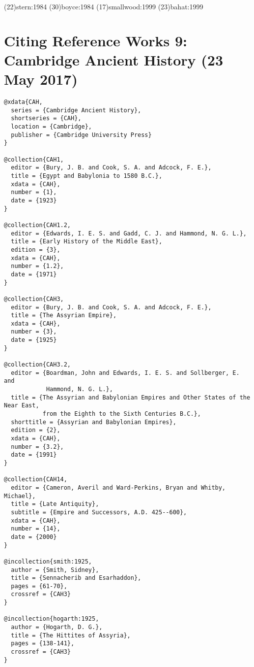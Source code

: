 \documentclass[a4paper]{article}
\begin{document}
\examplecite(22){stern:1984}
\examplecite(30){boyce:1984}
\examplecite(17){smallwood:1999}
\examplecite(23){bahat:1999}
\begin{verbcite}
  \nocite{CHJ2, CHJ4, CHJ5, CHJ6, CHJ7, CHJ8}
\end{verbcite}
\exampleabbreviations
\examplebibliography
{}

\section{Citing Reference Works 9: Cambridge Ancient History (23 May 2017)}

\begin{verbatim}
@xdata{CAH,
  series = {Cambridge Ancient History},
  shortseries = {CAH},
  location = {Cambridge},
  publisher = {Cambridge University Press}
}

@collection{CAH1,
  editor = {Bury, J. B. and Cook, S. A. and Adcock, F. E.},
  title = {Egypt and Babylonia to 1580 B.C.},
  xdata = {CAH},
  number = {1},
  date = {1923}
}

@collection{CAH1.2,
  editor = {Edwards, I. E. S. and Gadd, C. J. and Hammond, N. G. L.},
  title = {Early History of the Middle East},
  edition = {3},
  xdata = {CAH},
  number = {1.2},
  date = {1971}
}

@collection{CAH3,
  editor = {Bury, J. B. and Cook, S. A. and Adcock, F. E.},
  title = {The Assyrian Empire},
  xdata = {CAH},
  number = {3},
  date = {1925}
}

@collection{CAH3.2,
  editor = {Boardman, John and Edwards, I. E. S. and Sollberger, E. and
            Hammond, N. G. L.},
  title = {The Assyrian and Babylonian Empires and Other States of the Near East,
           from the Eighth to the Sixth Centuries B.C.},
  shorttitle = {Assyrian and Babylonian Empires},
  edition = {2},
  xdata = {CAH},
  number = {3.2},
  date = {1991}
}

@collection{CAH14,
  editor = {Cameron, Averil and Ward-Perkins, Bryan and Whitby, Michael},
  title = {Late Antiquity},
  subtitle = {Empire and Successors, A.D. 425--600},
  xdata = {CAH},
  number = {14},
  date = {2000}
}

@incollection{smith:1925,
  author = {Smith, Sidney},
  title = {Sennacherib and Esarhaddon},
  pages = {61-70},
  crossref = {CAH3}
}

@incollection{hogarth:1925,
  author = {Hogarth, D. G.},
  title = {The Hittites of Assyria},
  pages = {138-141},
  crossref = {CAH3}
}


\end{verbatim}
\end{document}
